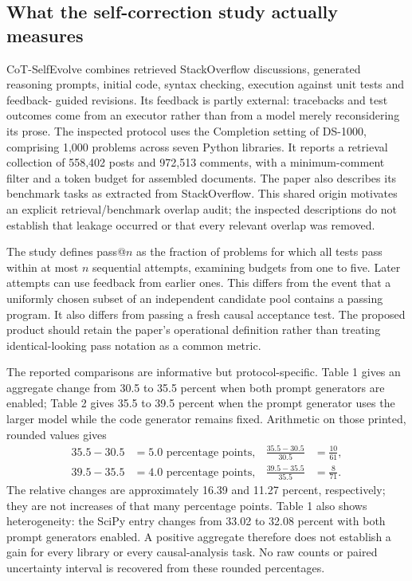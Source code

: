 \subsection{What the self-correction study actually measures}
\label{exec19:ragrepair-study}
CoT-SelfEvolve combines retrieved StackOverflow discussions, generated reasoning
prompts, initial code, syntax checking, execution against unit tests and feedback-
guided revisions. Its feedback is partly external: tracebacks and test outcomes
come from an executor rather than from a model merely reconsidering its prose.
The inspected protocol uses the Completion setting of DS-1000, comprising
1,000 problems across seven Python libraries. It reports a retrieval collection
of 558,402 posts and 972,513 comments, with a minimum-comment filter and a token
budget for assembled documents. The paper also describes its benchmark tasks
as extracted from StackOverflow. This shared origin motivates an explicit
retrieval/benchmark overlap audit; the inspected descriptions do not establish
that leakage occurred or that every relevant overlap was removed.
\citep{exec19_selfcorrection_study}

The study defines pass@$n$ as the fraction of problems for which all tests pass
within at most $n$ sequential attempts, examining budgets from one to five.
Later attempts can use feedback from earlier ones. This differs from the event
that a uniformly chosen subset of an independent candidate pool contains a
passing program. It also differs from passing a fresh causal acceptance test.
The proposed product should retain the paper's operational definition rather
than treating identical-looking pass notation as a common metric.
\citep{exec19_selfcorrection_study}

The reported comparisons are informative but protocol-specific. Table 1 gives
an aggregate change from 30.5 to 35.5 percent when both prompt generators are
enabled; Table 2 gives 35.5 to 39.5 percent when the prompt generator uses the
larger model while the code generator remains fixed. Arithmetic on those
printed, rounded values gives
\begin{align}
 35.5-30.5&=5.0\text{ percentage points},&
 \frac{35.5-30.5}{30.5}&=\frac{10}{61},\nonumber\\
 39.5-35.5&=4.0\text{ percentage points},&
 \frac{39.5-35.5}{35.5}&=\frac{8}{71}.
 \label{exec19:ragrepair-percentages}
\end{align}
The relative changes are approximately 16.39 and 11.27 percent, respectively;
they are not increases of that many percentage points. Table 1 also shows
heterogeneity: the SciPy entry changes from 33.02 to 32.08 percent with both
prompt generators enabled. A positive aggregate therefore does not establish
a gain for every library or every causal-analysis task. No raw counts or paired
uncertainty interval is recovered from these rounded percentages.
\citep{exec19_selfcorrection_study,exec19_retrieval_repair_reference}

